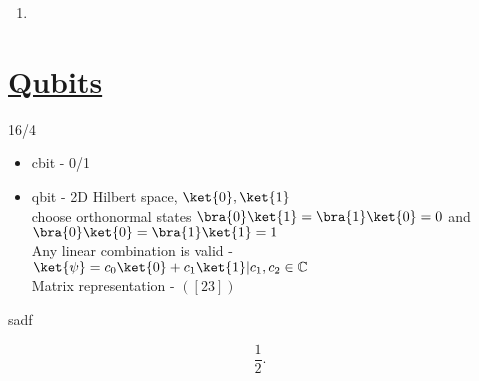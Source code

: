 \documentclass{article}
\begin{document}
\begin{enumerate}
  \item 
\end{enumerate}

\section{\underline{Qubits}}
\begin{flushright}
  16/4  
\end{flushright}

\begin{itemize}
  \item cbit - 0/1 
  \item qbit - 2D Hilbert space, $\ket{0} , \ket{1} $ \\
  choose orthonormal states $  \bra{0}\ket{1} = \bra{1}\ket{0} =  0   $ and $ \bra{0}\ket{0} = \bra{1}\ket{1} = 1 $\\
  Any linear combination is valid - $\ket{\psi} = c_0 \ket{0} + c_1 \ket{1} | c_1 ,c_2 \in \mathbb{C}$ \\
  Matrix representation - 
$ ([2 3]) $
\end{itemize}

sadf 

\[
\frac{1}{2}
.\]  
\end{document}
